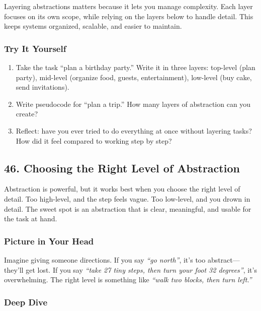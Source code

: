 \documentclass[
  letterpaper,
  DIV=11,
  numbers=noendperiod]{scrreprt}
\providecommand{\tightlist}{%
  \setlength{\itemsep}{0pt}\setlength{\parskip}{0pt}}
\begin{document}
Layering abstractions matters because it lets you manage complexity.
Each layer focuses on its own scope, while relying on the layers below
to handle detail. This keeps systems organized, scalable, and easier to
maintain.

\subsubsection{Try It Yourself}\label{try-it-yourself-44}

\begin{enumerate}
\def\labelenumi{\arabic{enumi}.}
\tightlist
\item
  Take the task ``plan a birthday party.'' Write it in three layers:
  top-level (plan party), mid-level (organize food, guests,
  entertainment), low-level (buy cake, send invitations).
\item
  Write pseudocode for ``plan a trip.'' How many layers of abstraction
  can you create?
\item
  Reflect: have you ever tried to do everything at once without layering
  tasks? How did it feel compared to working step by step?
\end{enumerate}

\subsection{46. Choosing the Right Level of
Abstraction}\label{choosing-the-right-level-of-abstraction}

Abstraction is powerful, but it works best when you choose the right
level of detail. Too high-level, and the step feels vague. Too
low-level, and you drown in detail. The sweet spot is an abstraction
that is clear, meaningful, and usable for the task at hand.

\subsubsection{Picture in Your Head}\label{picture-in-your-head-45}

Imagine giving someone directions. If you say \emph{``go north''}, it's
too abstract---they'll get lost. If you say \emph{``take 27 tiny steps,
then turn your foot 32 degrees''}, it's overwhelming. The right level is
something like \emph{``walk two blocks, then turn left.''}

\subsubsection{Deep Dive}\label{deep-dive-15}
\end{document}
